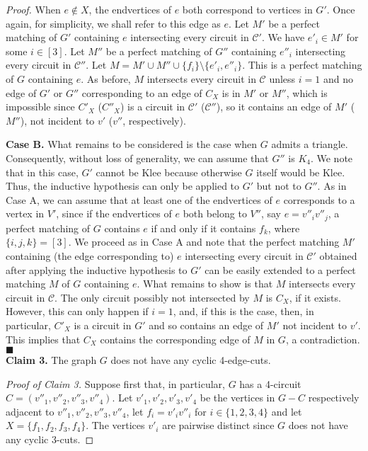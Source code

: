 \documentclass[]{theclass}
\begin{document}
\begin{proof}
When $e\notin X$, the endvertices of $e$ both correspond to vertices in $G'$. Once again, for simplicity, we shall refer to this edge as $e$. Let $M'$ be a perfect matching of $G'$ containing $e$  intersecting every circuit in $\mathcal{C}'$. We have $e'_{i}\in M'$ for some $i\in[3]$. Let $M''$ be a perfect matching of $G''$ containing $e''_{i}$ intersecting every circuit in $\mathcal{C}''$. Let $M=M'\cup M''\cup \{f_{i}\}\setminus \{e'_{i},e''_{i}\}$. This is a perfect matching of $G$ containing $e$. As before, $M$ intersects every circuit in $\mathcal{C}$ unless $i=1$ and no edge of $G'$ or $G''$ corresponding to an edge of $C_X$ is in $M'$ or $M''$, which is impossible since $C'_X$ ($C''_X$) is a circuit in $\mathcal{C}'$ ($\mathcal{C}''$), so it contains an edge of $M'$ ( $M''$), not incident to $v'$ ($v''$, respectively).

\textbf{Case B.} What remains to be considered is the case when $G$ admits a triangle. Consequently, without loss of generality, we can assume that $G''$ is $K_4$. We note that in this case, $G'$ cannot be Klee because otherwise $G$ itself would be Klee. Thus, the inductive hypothesis can only be applied to $G'$ but not to $G''$. As in Case A, we can assume that at least one of the endvertices of $e$ corresponds to a vertex in $V'$, since if the endvertices of $e$ both belong to $V''$, say $e=v''_{i}v''_{j}$, a perfect matching of $G$ contains $e$ if and only if it contains $f_k$, where $\{i,j,k\}=[3]$.  We proceed as in Case A and note that the perfect matching $M'$ containing (the edge corresponding to) $e$ intersecting every circuit in $\mathcal{C}'$ obtained after applying the inductive hypothesis to $G'$ can be easily extended to a perfect matching $M$ of $G$ containing $e$. What remains to show is that $M$ intersects every circuit in $\mathcal{C}$. The only circuit possibly not intersected by $M$ is $C_X$, if it exists. However, this can only happen if $i=1$, and, if this is the case, then, in particular, $C'_X$ is a circuit in $G'$ and so contains an edge of $M'$ not incident to $v'$. This implies that $C_X$ contains the corresponding edge of $M$ in $G$, a contradiction.\hfill {\tiny$\blacksquare$}\\

\noindent\textbf{Claim 3.} The graph $G$ does not have any cyclic 4-edge-cuts.

\noindent\emph{Proof of Claim 3.} 
Suppose first that, in particular, $G$ has a 4-circuit $C=(v''_1,v''_2,v''_3,v''_4)$. Let $v'_1, v'_2, v'_3, v'_4$ be the vertices in $G-C$ respectively adjacent to $v''_1,v''_2,v''_3,v''_4$, let $f_i=v'_iv''_i$ for $i\in\{1,2,3,4\}$ and let $X = \{f_1, f_2, f_3, f_4\}$. The vertices $v'_i$ are pairwise distinct since $G$ does not have any cyclic 3-cuts. 


\end{proof}
\end{document}
